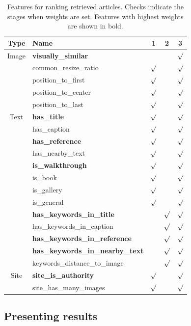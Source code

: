 \documentclass{www2010-submission}
\begin{document}
\begin{table}[t]
\centering \caption{Features for ranking retrieved 
articles. Checks
indicate the stages when weights are set. 
Features with highest weights are shown in bold.}
\label{tbl:feature_weights}
\vspace{0.2cm}

\begin{tabular}{|c|l||c|c|c|}
\hline
Type & Name & 1 & 2 & 3 \\
\hline
\hline
Image & \textbf{visually\_similar} & & & $\surd$ \\
& common\_resize\_ratio &$\surd$& & $\surd$\\
& position\_to\_first &$\surd$& & $\surd$\\
& position\_to\_center &$\surd$& & $\surd$\\
& position\_to\_last &$\surd$& & $\surd$ \\
\hline
Text & \textbf{has\_title} &$\surd$& & $\surd$ \\
& has\_caption &$\surd$& & $\surd$ \\
& \textbf{has\_reference}  &$\surd$& & $\surd$\\
& has\_nearby\_text &$\surd$& & $\surd$\\
& \textbf{is\_walkthrough} &$\surd$& & $\surd$\\
& is\_book &$\surd$& & $\surd$\\
& is\_gallery  &$\surd$& & $\surd$\\
& is\_general &$\surd$& & $\surd$\\
& \textbf{has\_keywords\_in\_title}  &&$\surd$ & $\surd$ \\
& has\_keywords\_in\_caption &&$\surd$ & $\surd$ \\
& \textbf{has\_keywords\_in\_reference} &&$\surd$ & $\surd$\\
& \textbf{has\_keywords\_in\_nearby\_text} &&$\surd$ & $\surd$\\
& keywords\_distance\_to\_image && $\surd$ & $\surd$\\
\hline
Site & \textbf{site\_is\_authority} &$\surd$& & $\surd$\\
& site\_has\_many\_images &$\surd$& & $\surd$\\
\hline

\end{tabular}
\end{table}



\subsection{Presenting results}
\label{sec:presenting_results}
\end{document}
